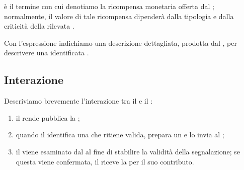 \medskip

\Bountyreward è il termine con cui denotiamo la ricompensa monetaria offerta dal \BI \cite{hoffman2021bountychain}; normalmente, il valore di tale ricompensa dipenderà dalla tipologia e dalla criticità della \vulnerability rilevata \cite{canidio2021verioss}.

\medskip

Con l'espressione \bugreport indichiamo una descrizione dettagliata, prodotta dal \BH, per descrivere una \vulnerability identificata \cite{hoffman2021bountychain}.

\subsection{Interazione}

Descriviamo brevemente l'interazione tra il \BI e il \BH \cite{hoffman2021bountychain}:
\begin{enumerate}


\item il \BI rende pubblica la \bugbounty;

\item quando il \BH identifica una \vulnerability che ritiene valida, prepara un \bugreport e lo invia al \BI;

\item il \bugreport viene esaminato dal \BI al fine di stabilire la validità della segnalazione; se questa viene confermata, il \BH riceve la \bountyreward per il suo contributo.

\end{enumerate}


